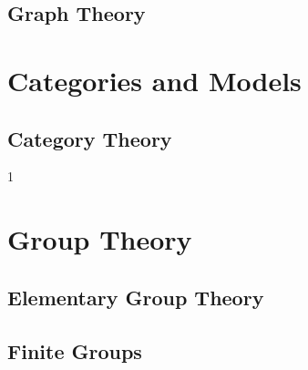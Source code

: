 \documentclass{book}                                                           %
\newcommand*{\TOPPATH}{books}
\newcommand*{\PARPATH}{\TOPPATH/}
\newcommand*{\PATH}{\TOPPATH/}
\newcounter{endpage}
\def\compilealgebra{1}
\begin{document}
                \chapter{Graph Theory}
                    \renewcommand{\PATH}{\PARPATH/Graph_Theory}
                    \label{chapt:Graph_Theory}%
            \part{Categories and Models}
                \renewcommand{\PARPATH}{\TOPPATH/Foundations/Categories_and_Models}
                \chapter{Category Theory}
                    \renewcommand{\PATH}{\PARPATH}
                    \label{chapt:Category_Theory}%
        \clearpage
        \setcounter{endpage}{\thepage}
    \else
        \setcounter{book}{1}
        \setcounter{part}{3}
        \setcounter{chapter}{10}
    \fi

    \if\compilealgebra1
            \label{book:Algebra}%
            \setcounter{page}{\value{endpage}}
            \part{Group Theory}
                \renewcommand{\PARPATH}{\TOPPATH/Algebra/Group_Theory}
                \chapter{Elementary Group Theory}
                    \renewcommand{\PATH}{\PARPATH/Elementary_Group_Theory}
                    \label{chapt:Elementary_Group_Theory}%
                    
                    
                    
                \chapter{Finite Groups}
                    \renewcommand{\PATH}{\PARPATH/Finite_Groups}
                    \label{chapt:Finite_Groups}%
                    
                    
\end{document}
